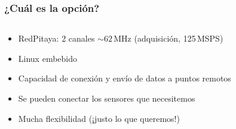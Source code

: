 \documentclass{beamer}
\begin{document}
\begin{frame}
	\frametitle{¿Cuál es la opción?}
	\begin{columns}
		\begin{column}{0.60\textwidth}
			\begin{block}{}
	    	\begin{itemize} %
								\item RedPitaya: 2 canales $\sim 62\,\text{MHz}$ (adquisición, 125\,MSPS)
								\item \alert{Linux embebido}
	      	\item Capacidad de conexión y envío de datos a puntos remotos
	      	\item Se pueden conectar los sensores que necesitemos 
					\item Mucha \alert{flexibilidad} (¡justo lo que queremos!)
	    	\end{itemize}
			\end{block}
		\end{column} 
	 	\begin{column}{0.4\textwidth}
	 \end{column}
	\end{columns}
\end{frame} 

\end{document}
